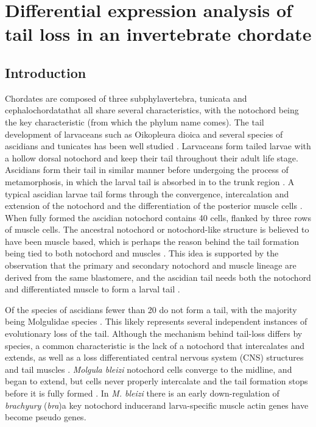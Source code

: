 \chapter{Differential expression analysis of tail loss in an invertebrate chordate}

\section{Introduction}

Chordates are composed of three subphyla\textemdash vertebra, tunicata and cephalochordata\textemdash that all share several characteristics, with the notochord being the key characteristic (from which the phylum name comes). The tail development of larvaceans such as Oikopleura dioica and several species of ascidians and tunicates has been well studied \cite{jeffery_factors_1992,nakatani_mutations_1999,kugler_evolutionary_2011}. Larvaceans form tailed larvae with a hollow dorsal notochord and keep their tail throughout their adult life stage. Ascidians form their tail in similar manner before undergoing the process of metamorphosis, in which the larval tail is absorbed in to the trunk region \cite{paris_history_2008}. A typical ascidian larvae tail forms through the convergence, intercalation and extension of the notochord and the differentiation of the posterior muscle cells \cite{swalla_mechanisms_1993}. When fully formed the ascidian notochord contains 40 cells, flanked by three rows of muscle cells. The ancestral notochord or notochord-like structure is believed to have been muscle based, which is perhaps the reason behind the tail formation being tied to both notochord and muscles \cite{lauri_development_2014}. This idea is supported by the observation that the primary and secondary notochord and muscle lineage are derived from the same blastomere, and the ascidian tail needs both the notochord and differentiated muscle to form a larval tail \cite{nishida_cell_1987,di_gregorio_tail_2002}.

Of the  species of ascidians fewer than 20 do not form a tail, with the majority being Molgulidae species \cite{berrill_studies_1931,huber_evolution_2000}. This likely represents several independent instances of evolutionary loss of the tail. Although the mechanism behind tail-loss differs by species, a common characteristic is the lack of a notochord that intercalates and extends, as well as a loss differentiated central nervous system (CNS) structures and tail muscles \cite{swalla_mechanisms_1993}. \textit{Molgula bleizi} notochord cells converge to the midline, and began to extend, but cells never properly intercalate and the tail formation stops before it is fully formed \cite{jeffery_evolution_1999}. In \textit{M. bleizi} there is an early down-regulation of \textit{brachyury} (\textit{bra})\textemdash a key notochord inducer\textemdash and larva-specific muscle actin genes have become pseudo genes.   

